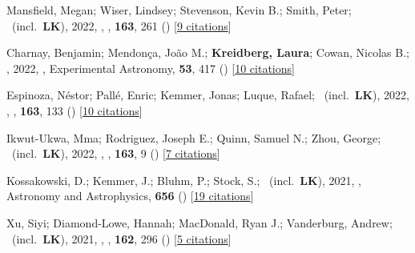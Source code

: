 \item[{\color{numcolor}\scriptsize65}] Mansfield, Megan; Wiser, Lindsey; Stevenson, Kevin B.; Smith, Peter; \etal\ (incl.\ \textbf{LK}), 2022, , \aj, \textbf{163}, 261 () [\href{https://ui.adsabs.harvard.edu/abs/2022AJ....163..261M}{9 citations}]

\item[{\color{numcolor}\scriptsize64}] Charnay, Benjamin; Mendon{\c{c}}a, Jo{\~a}o M.; \textbf{Kreidberg, Laura}; Cowan, Nicolas B.; \etal, 2022, , Experimental Astronomy, \textbf{53}, 417 () [\href{https://ui.adsabs.harvard.edu/abs/2022ExA....53..417C}{10 citations}]

\item[{\color{numcolor}\scriptsize63}] Espinoza, N{\'e}stor; Pall{\'e}, Enric; Kemmer, Jonas; Luque, Rafael; \etal\ (incl.\ \textbf{LK}), 2022, , \aj, \textbf{163}, 133 () [\href{https://ui.adsabs.harvard.edu/abs/2022AJ....163..133E}{10 citations}]

\item[{\color{numcolor}\scriptsize62}] Ikwut-Ukwa, Mma; Rodriguez, Joseph E.; Quinn, Samuel N.; Zhou, George; \etal\ (incl.\ \textbf{LK}), 2022, , \aj, \textbf{163}, 9 () [\href{https://ui.adsabs.harvard.edu/abs/2022AJ....163....9I}{7 citations}]

\item[{\color{numcolor}\scriptsize61}] Kossakowski, D.; Kemmer, J.; Bluhm, P.; Stock, S.; \etal\ (incl.\ \textbf{LK}), 2021, , Astronomy and Astrophysics, \textbf{656} () [\href{https://ui.adsabs.harvard.edu/abs/2021A&A...656A.124K}{19 citations}]

\item[{\color{numcolor}\scriptsize60}] Xu, Siyi; Diamond-Lowe, Hannah; MacDonald, Ryan J.; Vanderburg, Andrew; \etal\ (incl.\ \textbf{LK}), 2021, , \aj, \textbf{162}, 296 () [\href{https://ui.adsabs.harvard.edu/abs/2021AJ....162..296X}{5 citations}]

